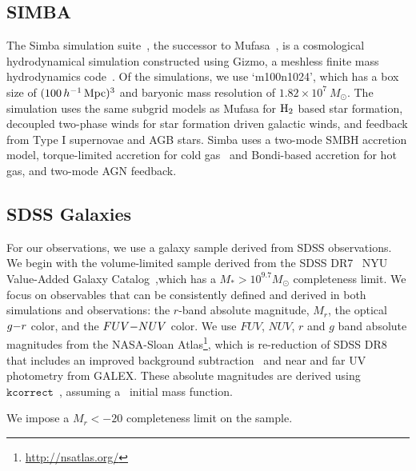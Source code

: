 \subsection{SIMBA} \label{sec:simba}
The {\sc Simba} simulation suite~\citep{dave2019}, the successor to {\sc
Mufasa}~\citep{dave2016, dave2017, dave2017a}, is a cosmological hydrodynamical
simulation constructed using {\sc Gizmo}, a meshless finite mass hydrodynamics 
code~\citep{hopkins2015, hopkins2017}. Of the simulations, we use
`m100n1024', which has a box size of $(100\,h^{-1}\,{\rm Mpc})^3$ and baryonic 
mass resolution of $1.82 \times 10^7\ M_\odot$. The simulation uses the same
subgrid models as {\sc Mufasa} for $\rm H_2$ based star formation, decoupled
two-phase winds for star formation driven galactic winds, and feedback from 
Type I supernovae and AGB stars. {\sc Simba} uses a two-mode SMBH accretion 
model, torque-limited accretion for cold gas~\citep{angles-alcazar2017} and 
Bondi-based accretion for hot gas, and two-mode AGN feedback. %

\subsection{SDSS Galaxies} \label{sec:obs} 
For our observations, we use a galaxy sample derived from SDSS observations. 
We begin with the volume-limited \cite{tinker2011} sample derived from the SDSS
DR7~\citep{abazajian2009} NYU Value-Added Galaxy
Catalog~\citep[VAGC;][]{blanton2005},which has a $M_* > 10^{9.7} M_\odot$
completeness limit. 
We focus on observables that can be consistently defined and derived in both simulations 
and observations: the $r$-band absolute magnitude, $M_r$, the optical $g{-}r$
color, and the $FUV{-}NUV$ color. 
We use $FUV$, $NUV$, $r$ and $g$ band absolute magnitudes from the NASA-Sloan
Atlas\footnote{\url{http://nsatlas.org/}}, which is re-reduction of SDSS DR8
\citep{aihara2011} that includes an improved background subtraction~\citep{blanton2011} 
and near and far UV photometry from GALEX. These absolute magnitudes are
derived using $\mathtt{kcorrect}$~\citep{blanton2007a}, assuming
a~\cite{chabrier2003} initial mass function. 

We impose a $M_r < -20$ completeness limit on the \cite{tinker2011} sample.

